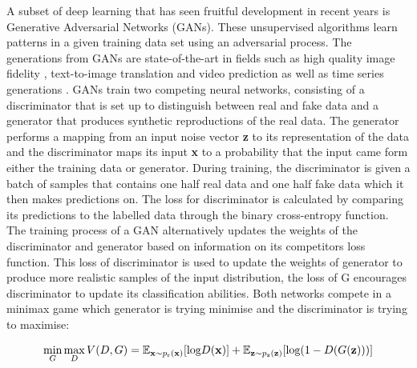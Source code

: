 \documentclass[12pt]{iopart}
\begin{document}

A subset of deep learning that has seen fruitful development in recent years \cite{Goodfellow2014} is Generative Adversarial Networks (GANs). These unsupervised algorithms learn patterns in a given training data set using an adversarial process. The generations from GANs are state-of-the-art in fields such as high quality image fidelity \cite{brock2018large,karras2019analyzing}, text-to-image translation \cite{reed2016generative} and video prediction \cite{liang2017dual} as well as time series generations \cite{esteban2017realvalued}. 
GANs train two competing neural networks, consisting of a discriminator that is set up to distinguish
between real and fake data and a generator that produces synthetic
reproductions of the real data. The generator performs a mapping
from an input noise vector \textbf{z} to its representation of the data and the discriminator  maps its
input \textbf{x} to a probability that the input came form either the training
data or generator.  During training, the discriminator is given a batch of samples that contains one half real data
and one half fake data which it then makes predictions on. The
loss for discriminator  is calculated by comparing its predictions to the labelled data through the binary cross-entropy function. The training process
of a GAN alternatively updates the weights of the discriminator  and generator based on information
on its competitors loss function. This loss of discriminator  is used to update the weights
of generator to produce more realistic samples of the input distribution, the loss of G
encourages discriminator  to update its classification abilities. Both networks compete
in a minimax game which generator is trying
minimise and the discriminator is trying to maximise:

\begin{equation}
\mathop{\text{min}}_{G}  \mathop{\text{max}}_{D} V(D,G) = \mathbb{E}_{\mathbf{x} \sim p_{\text{r}}(\mathbf{x})} [\text{log} D(\mathbf{x})] \\ + \mathbb{E}_{\mathbf{z} \sim p_{\text{z}}(\mathbf{z})} [\text{log}(1-D(G(\mathbf{z})))]
\label{equation:GANloss}
\end{equation}
\end{document}
